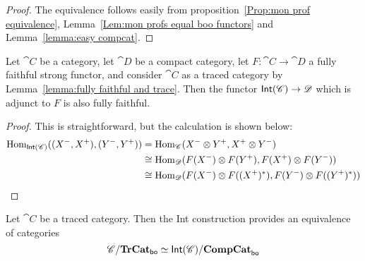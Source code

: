 \documentclass[12pt,oneside,article,draft]{memoir}
\begin{document}
\begin{proof}
The equivalence follows easily from proposition~\ref{Prop:mon prof equivalence}, Lemma~\ref{Lem:mon profs equal boo functors} and Lemma~\ref{lemma:easy compcat}.

\end{proof} 

\begin{lemma}\label{lemma:more fully faithfulness}
	Let $\cat{C}$ be a category, let $\cat{D}$ be a compact category, let $F\colon\cat{C}\to\cat{D}$ a fully faithful strong functor, and consider $\cat{C}$ as a traced category by Lemma~\ref{lemma:fully faithful and trace}. Then the functor $\mathsf{Int}(\mathscr{C})\to\mathscr{D}$ which is adjunct to $F$ is also fully faithful.
\end{lemma}

\begin{proof}
This is straightforward, but the calculation is shown below:
\begin{align*}
\operatorname{Hom}_{\mathsf{Int}(\mathscr{C})}((X^-,X^+),(Y^-,Y^+))&=\operatorname{Hom}_{\mathscr{C}}(X^-\otimes Y^+,X^+\otimes Y^-)\\
&\cong\operatorname{Hom}_{\mathscr{D}}(F(X^-)\otimes F(Y^+),F(X^+)\otimes F(Y^-))\\
&\cong\operatorname{Hom}_{\mathscr{D}}(F(X^-)\otimes F((X^+)^*),F(Y^-)\otimes F((Y^+)^*))
\end{align*}

\end{proof}

\begin{proposition}\label{prop:slice boo int}
	Let $\cat{C}$ be a traced category. Then the Int construction provides an equivalence of categories
	\[
		\mathscr{C}/\mathbf{TrCat}_{\mathsf{bo}} \simeq \mathsf{Int}(\mathscr{C})/\mathbf{CompCat}_{\mathsf{bo}}
	\]
\end{proposition}
\end{document}
